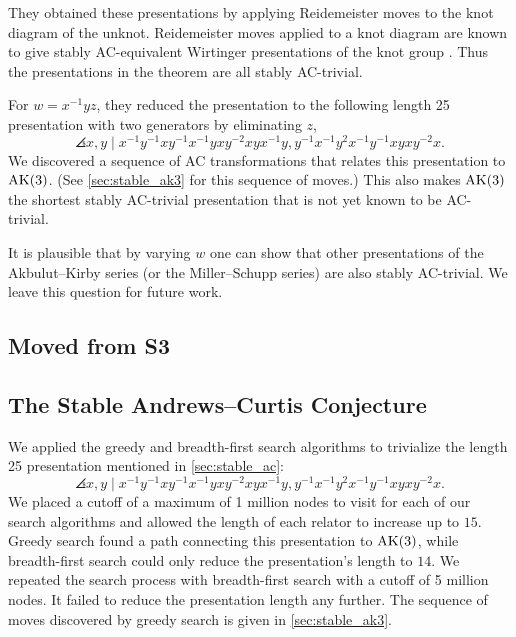 They obtained these presentations by applying Reidemeister moves to the knot diagram of the unknot.
Reidemeister moves applied to a knot diagram are known to give stably AC-equivalent Wirtinger presentations of the knot group \cite{WADA1994241}.
Thus the presentations in the theorem are all stably AC-trivial.

For $w = x^{-1}yz$, they reduced the presentation to the following length 25 presentation with two generators by eliminating $z$,
\[
\angles{ x, y \mid
	x^{-1}y^{-1}xy^{-1}x^{-1}yxy^{-2}xyx^{-1}y,
	y^{-1}x^{-1}y^2x^{-1}y^{-1}xyxy^{-2}x }.
\]
We discovered a sequence of AC transformations that relates this presentation to $\text{AK}(3)$.
(See \autoref{sec:stable_ak3} for this sequence of moves.)
This also makes $\text{AK}(3)$ the shortest stably AC-trivial presentation that is not yet known to be AC-trivial.


It is plausible that by varying $w$ one can show that other presentations of the Akbulut--Kirby series (or the Miller--Schupp series) are also stably AC-trivial.
We leave this question for future work.

\subsection{Moved from S3}

\subsection{The Stable Andrews--Curtis Conjecture}

We applied the greedy and breadth-first search algorithms to trivialize the length 25 presentation mentioned in \autoref{sec:stable_ac}:
\[
\angles{ x, y \mid
	x^{-1}y^{-1}xy^{-1}x^{-1}yxy^{-2}xyx^{-1}y,
	y^{-1}x^{-1}y^2x^{-1}y^{-1}xyxy^{-2}x }.
\]
We placed a cutoff of a maximum of 1 million nodes to visit for each of our search algorithms and allowed the length of each relator to increase up to $15$.
Greedy search found a path connecting this presentation to $\text{AK}(3)$, while breadth-first search could only reduce the presentation's length to $14$.
We repeated the search process with breadth-first search with a cutoff of 5 million nodes.
It failed to reduce the presentation length any further.
The sequence of moves discovered by greedy search is given in \autoref{sec:stable_ak3}.

